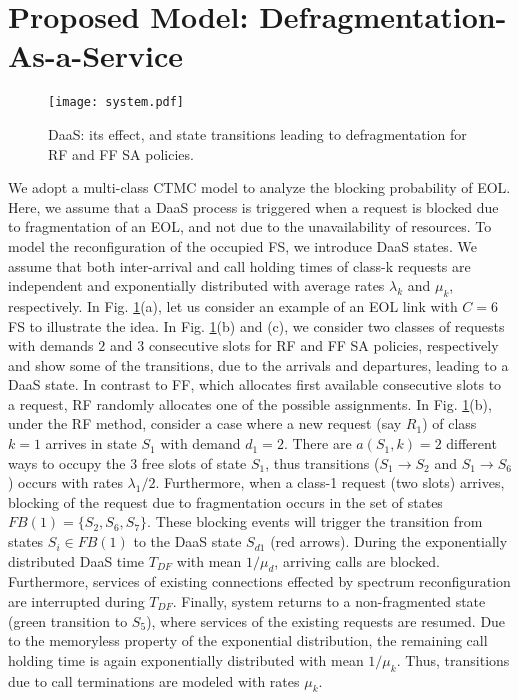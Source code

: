 \documentclass[letterpaper,10pt]{article}
\begin{document}
\section{Proposed Model: Defragmentation-As-a-Service}
\begin{figure}[t]
 \centering
\texttt{[image: system.pdf]}
\vspace{-8mm}
  \caption{DaaS: its effect, and state transitions leading to defragmentation for RF and FF SA policies.}
\label{fig:system}
\vspace{-2mm}
\end{figure}
\vspace{-1mm}
We adopt a multi-class CTMC model to analyze the blocking probability of EOL.
Here, we assume that a DaaS process is triggered when a request is blocked due to fragmentation of an EOL, and not due to the unavailability of resources. To model the reconfiguration of the occupied FS, we introduce DaaS states. We assume that both inter-arrival  and call holding times of class-k requests are independent and  exponentially distributed with average rates $\lambda_k$ and  $\mu_k$, respectively. In Fig. \ref{fig:system}(a), let us consider an example of an EOL link with $C=6$ FS to illustrate the idea.  In Fig. \ref{fig:system}(b) and (c), we consider two classes of requests with demands $2$ and $3$ consecutive slots for RF and FF SA policies, respectively and show some of the transitions, due to the arrivals and departures, leading to a DaaS state. In contrast to FF, which allocates first available consecutive slots to a request, RF randomly allocates one of the possible assignments. In Fig. \ref{fig:system}(b), under the RF method, consider a case where a new request (say $R_1$) of class $k=1$ arrives in state $S_1$ with demand $d_1=2$. There are $a(S_1,k)=2$ different ways to occupy the $3$ free slots of state $S_1$, thus transitions ($S_1 \rightarrow S_2$ and $S_1 \rightarrow S_6$) occurs with rates $\lambda_1/2$.
Furthermore, when a class-1 request (two slots) arrives, blocking of the request due to fragmentation occurs in the set of states $FB(1)=\{S_2, S_6, S_7\}$. 
These blocking events will trigger the transition from states $S_i \in FB(1)$  to the DaaS state $S_{d1}$ (red arrows). During the exponentially distributed DaaS time $T_{DF}$ with mean $1/\mu_d$, arriving calls are blocked. Furthermore, services of existing connections effected by spectrum reconfiguration are interrupted during $T_{DF}$. Finally, system returns to a non-fragmented state (green transition to $S_5$), where services of the existing requests are resumed. Due to the memoryless property of the exponential distribution, the remaining call holding time is again exponentially distributed with mean $1/\mu_k$. Thus, transitions due to call terminations are modeled with rates $\mu_k$.
\end{document}
